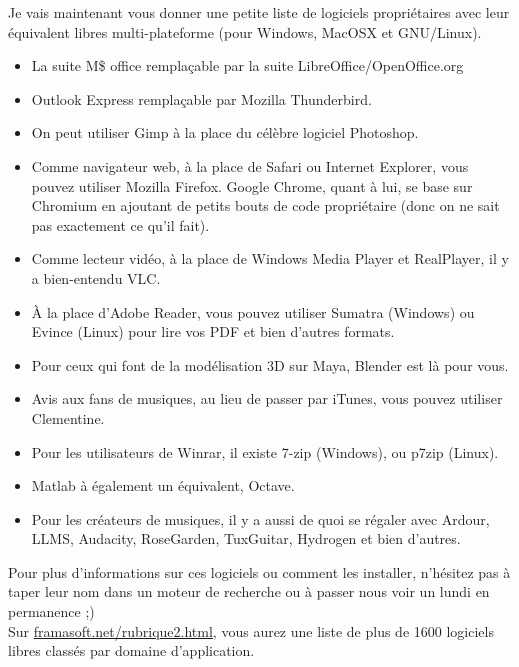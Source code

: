 Je vais maintenant vous donner une petite liste de logiciels propriétaires avec leur équivalent libres multi-plateforme (pour Windows, MacOSX et GNU/Linux). %
\begin{itemize}
	\item La suite M\$ office remplaçable par la suite LibreOffice/OpenOffice.org
	\item Outlook Express remplaçable par Mozilla Thunderbird.
	\item On peut utiliser Gimp à la place du célèbre logiciel Photoshop.
	\item Comme navigateur web, à la place de Safari ou Internet Explorer, vous pouvez utiliser Mozilla Firefox. Google Chrome, quant à lui, se base sur Chromium en ajoutant de petits bouts de code propriétaire (donc on ne sait pas exactement ce qu'il fait).
	\item Comme lecteur vidéo, à la place de Windows Media Player et RealPlayer, il y a bien-entendu VLC.
	\item À la place d'Adobe Reader, vous pouvez utiliser Sumatra (Windows) ou Evince (Linux) pour lire vos PDF et bien d'autres formats. %
	\item Pour ceux qui font de la modélisation 3D sur Maya, Blender est là pour vous.
	\item Avis aux fans de musiques, au lieu de passer par iTunes, vous pouvez utiliser Clementine. %
	\item Pour les utilisateurs de Winrar, il existe 7-zip (Windows), ou p7zip (Linux).
	\item Matlab à également un équivalent, Octave.
	\item Pour les créateurs de musiques, il y a aussi de quoi se régaler avec Ardour, LLMS, Audacity, RoseGarden, TuxGuitar, Hydrogen et bien d'autres.
\end{itemize}
Pour plus d'informations sur ces logiciels ou comment les installer, n'hésitez pas à taper leur nom dans un moteur de recherche ou à passer nous voir un lundi en permanence ;)\\
Sur \url{framasoft.net/rubrique2.html}, vous aurez une liste de plus de 1600 logiciels libres classés par domaine d'application.





	
